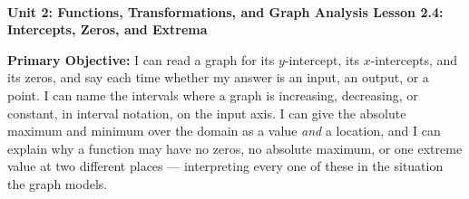 \documentclass[10pt]{article}
\newcommand{\UnitNumberName}{Unit 2: Functions, Transformations, and Graph Analysis \quad}
\newcommand{\LessonNumberName}{Lesson 2.4: Intercepts, Zeros, and Extrema}
\begin{document}
\begin{center}
    {\Large\bfseries \CourseName \\
    {\small\bfseries \UnitNumberName \LessonNumberName}}
\end{center}

\begin{tcolorbox}[colback=mist, colframe=royal, boxrule=0.9pt, arc=2mm,
    left=2mm, right=2mm, top=1.5mm, bottom=1.5mm]
    \textbf{Primary Objective:} I can read a graph for its $y$-intercept, its $x$-intercepts, and its
    zeros, and say each time whether my answer is an input, an output, or a point. I can name the
    intervals where a graph is increasing, decreasing, or constant, in interval notation, on the
    input axis. I can give the absolute maximum and minimum over the domain as a value \emph{and} a
    location, and I can explain why a function may have no zeros, no absolute maximum, or one extreme
    value at two different places --- interpreting every one of these in the situation the graph
    models.
\end{tcolorbox}
\end{document}
